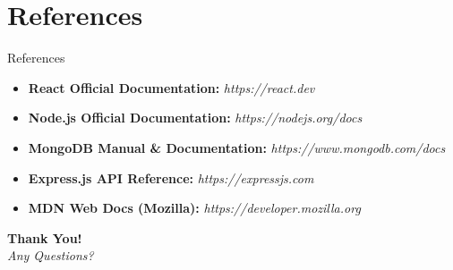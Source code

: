 \documentclass[aspectratio=169, 11pt]{beamer}
\begin{document}
\section{References}
\begin{frame}{References}
    \begin{itemize}
        \item \textbf{React Official Documentation:} \textit{https://react.dev}
        \item \textbf{Node.js Official Documentation:} \textit{https://nodejs.org/docs}
        \item \textbf{MongoDB Manual \& Documentation:} \textit{https://www.mongodb.com/docs}
        \item \textbf{Express.js API Reference:} \textit{https://expressjs.com}
        \item \textbf{MDN Web Docs (Mozilla):} \textit{https://developer.mozilla.org}
    \end{itemize}
\end{frame}

\begin{frame}
    \centering
    \Huge \textbf{Thank You!} \\
    \vspace{1cm}
    \large \textit{Any Questions?}
\end{frame}
\end{document}
